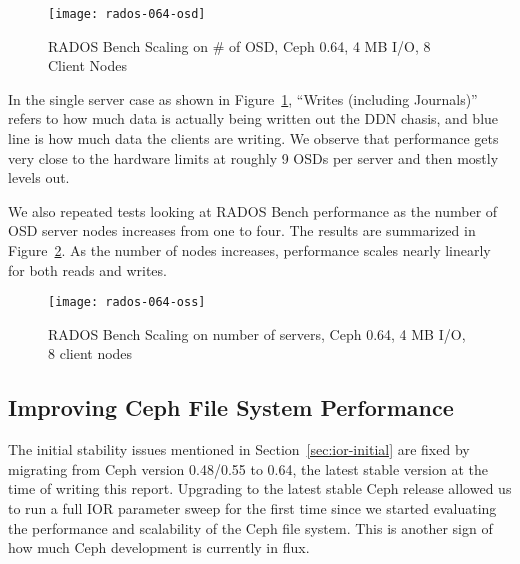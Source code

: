 

\begin{figure}[htb]
\centering
\texttt{[image: rados-064-osd]}
\caption{RADOS Bench Scaling on \# of OSD, Ceph 0.64, 4 MB I/O, 8 Client Nodes}
\label{fig:rados-064-osd}
\end{figure}

In the single server case as shown in Figure~\ref{fig:rados-064-osd}, ``Writes
(including Journals)'' refers to how much data is actually being written out the
DDN chasis, and blue line is how much data the clients are writing.
We observe that performance gets very close to the hardware limits at roughly 9
OSDs per server and then mostly levels out.

We also repeated tests looking at RADOS Bench performance as the number of OSD
server nodes increases from one to four. The results are summarized in
Figure~\ref{fig:rados-064-oss}. As the number of nodes increases, performance
scales nearly linearly for both reads and writes.


\begin{figure}[htb]
\centering
\texttt{[image: rados-064-oss]}
\caption{RADOS Bench Scaling on number of servers, Ceph 0.64, 4 MB I/O, 8 client
nodes}
\label{fig:rados-064-oss}
\end{figure}



\subsection{Improving Ceph File System Performance}
\label{sec:ceph-tuning-fs}

The initial stability issues mentioned in Section~\ref{sec:ior-initial} are
fixed by migrating from Ceph version 0.48/0.55 to 0.64, the latest stable version at the
time of writing this report.  Upgrading to the latest stable Ceph release
allowed us to run a full IOR parameter sweep for the first time since we
started evaluating the performance and scalability of the Ceph file system.
This is another sign of how much Ceph development is currently in flux.

